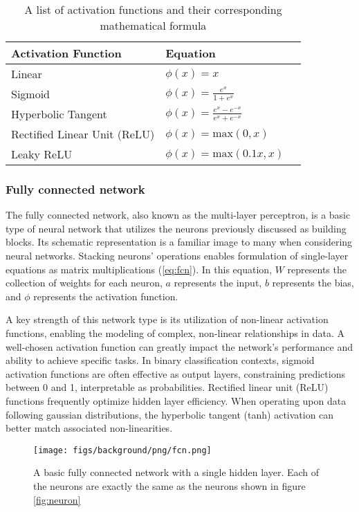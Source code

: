 \begin{table}[H]
    \caption{A list of activation functions and their corresponding mathematical formula} \label{tab:activation-functions}
    \begin{tabularx}{\columnwidth}{|X|X|X|}
        \hline
        {\bf Activation Function} & {\bf Equation} \\ \hline 
        Linear & $\phi(x) = x$ \\\hline
        Sigmoid & $\phi(x) = \frac{e^{x}}{1 + e^{x}}$\\ \hline 
        Hyperbolic Tangent & $\phi(x) = \frac{e^x - e^{-x}}{e^{x} + e^{-x}}$\\ \hline 
        Rectified Linear Unit (ReLU) & $\phi(x) = \text{max}(0,x)$\\ \hline 
        Leaky ReLU & $\phi(x) = \text{max}(0.1x,x)$ \\ \hline 
    \end{tabularx}
\end{table}

\subsubsection{Fully connected network}
The fully connected network, also known as the multi-layer perceptron, is a basic type of neural network that utilizes the neurons previously discussed as building blocks.
Its schematic representation is a familiar image to many when considering neural networks.
Stacking neurons' operations enables formulation of single-layer equations as matrix multiplications (\cref{eq:fcn}).
In this equation, $W$ represents the collection of weights for each neuron, $a$ represents the input, $b$ represents the bias, and $\phi$ represents the activation function.

A key strength of this network type is its utilization of non-linear activation functions, enabling the modeling of complex, non-linear relationships in data.
A well-chosen activation function can greatly impact the network's performance and ability to achieve specific tasks.
In binary classification contexts, sigmoid activation functions are often effective as output layers, constraining predictions between 0 and 1, interpretable as probabilities.
Rectified linear unit (ReLU) functions frequently optimize hidden layer efficiency.
When operating upon data following gaussian distributions, the hyperbolic tangent (tanh) activation can better match associated non-linearities.

\begin{figure}[h!]
    \centering
    \texttt{[image: figs/background/png/fcn.png]}
    \caption[A basic fully connected network with a single hidden layer]{A basic fully connected network with a single hidden layer. Each of the neurons are exactly the same as the neurons shown in figure \ref{fig:neuron}}
    \label{fig:fcn}
\end{figure}

